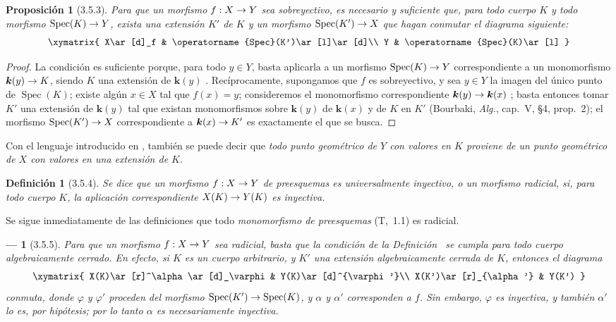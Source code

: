 \documentclass[oneside]{amsart}
\theoremstyle{ega-env-style}
\newtheorem*{env}{---}
\theoremstyle{ega-thm-env-style}
\newtheorem*{proposition}{Proposición}
\theoremstyle{ega-defn-env-style}
\newtheorem*{definition}{Definición}
\renewcommand{\to}{\mathchoice{\longrightarrow}{\rightarrow}{\rightarrow}{\rightarrow}}
\newcommand{\oldpage}[2][]{{\marginnote{\normalfont{\textbf{#1}~|~#2}}}\ignorespaces}
\let\EGAOriginalLabel\label
\renewcommand{\label}[1]{\phantomsection\EGAOriginalLabel{#1}}
\begin{document}
\begin{proposition}[3.5.3]
\label{I.3.5.3}
Para que un morfismo $f:X\to Y$ sea sobreyectivo, es necesario y suficiente que, para todo cuerpo $K$ y todo morfismo $\operatorname{Spec}(K)\to Y$, exista una extensión $K'$ de $K$ y un morfismo $\operatorname{Spec}(K')\to X$ que hagan conmutar el diagrama siguiente:
\label{I.3.5.3.surjectivity-diagram-fr}
\[
  \xymatrix{
    X\ar[d]_f & \operatorname{Spec}(K')\ar[l]\ar[d]\\
    Y & \operatorname{Spec}(K)\ar[l]
  }
\]
\end{proposition}

\begin{proof}
La condición es suficiente porque, para todo $y\in Y$, basta aplicarla a un morfismo $\operatorname{Spec}(K)\to Y$ correspondiente a un monomorfismo $\boldsymbol{k}(y)\to K$, siendo $K$ una extensión de $\boldsymbol{k}(y)$ .
Recíprocamente, supongamos que $f$ es sobreyectivo, y sea $y\in Y$ la imagen del único punto de $\operatorname{Spec}(K)$; existe algún $x\in X$ tal que $f(x)=y$; consideremos el monomorfismo correspondiente $\boldsymbol{k}(y)\to\boldsymbol{k}(x)$ ; basta entonces tomar $K'$ una extensión de $\boldsymbol{k}(y)$ tal que existan monomorfismos sobre $\boldsymbol{k}(y)$ de $\boldsymbol{k}(x)$ y de $K$ en $K'$ (Bourbaki, \emph{Alg.}, cap.~V, §4, prop.~2); el morfismo $\operatorname{Spec}(K')\to X$ correspondiente a $\boldsymbol{k}(x)\to K'$ es exactamente el que se busca.
\end{proof}

Con el lenguaje introducido en , también se puede decir que \emph{todo punto geométrico de $Y$ con valores en $K$ proviene de un punto geométrico de $X$ con valores en una extensión de $K$}.

\begin{definition}[3.5.4]
\label{I.3.5.4}
Se dice que un morfismo $f:X\to Y$ de preesquemas es \emph{universalmente inyectivo}, o un \emph{morfismo radicial}, si, para todo cuerpo $K$, la aplicación correspondiente $X(K)\to Y(K)$ es inyectiva.
\end{definition}

Se sigue inmediatamente de las definiciones que todo \emph{monomorfismo de preesquemas} (T,~1.1) es radicial.

\begin{env}[3.5.5]
\label{I.3.5.5}
Para que un morfismo $f:X\to Y$ sea radicial, basta que la condición de la Definición~ se cumpla para todo cuerpo \emph{algebraicamente cerrado}.
En efecto, si $K$ es un cuerpo arbitrario, y $K'$ una extensión algebraicamente cerrada de $K$, entonces el diagrama
\label{I.3.5.5.algebraic-closure-diagram-fr}
\[
  \xymatrix{
    X(K)\ar[r]^\alpha\ar[d]_\varphi & Y(K)\ar[d]^{\varphi'}\\
    X(K')\ar[r]_{\alpha'} & Y(K')
  }
\]
\oldpage[I]{116}conmuta, donde $\varphi$ y $\varphi'$ proceden del morfismo $\operatorname{Spec}(K')\to\operatorname{Spec}(K)$, y $\alpha$ y $\alpha'$ corresponden a $f$.
Sin embargo, $\varphi$ es inyectiva, y también $\alpha'$ lo es, por hipótesis; por lo tanto $\alpha$ es necesariamente inyectiva.
\end{env}
\end{document}
